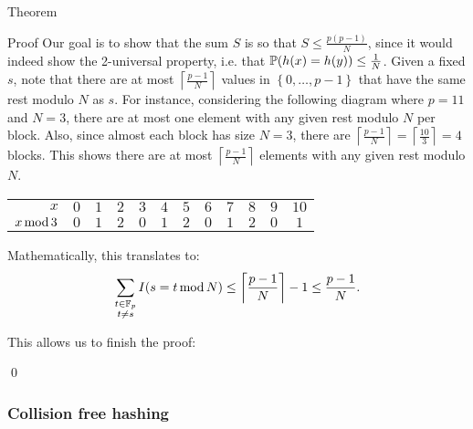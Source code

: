 \documentclass[a4paper]{article}
\begin{document}
\begin{parag}{Theorem}
\begin{subparag}{Proof}
            Our goal is to show that the sum $S$ is so that $S \leq \frac{p\left(p-1\right)}{N}$, since it would indeed show the 2-universal property, i.e. that $\prob\left(h\left(x\right) = h\left(y\right)\right) \leq \frac{1}{N}$. Given a fixed $s$, note that there are at most $\left\lceil \frac{p-1}{N} \right\rceil $ values in $\left\{0, \ldots, p-1\right\}$ that have the same rest modulo $N$ as $s$. For instance, considering the following diagram where $p = 11$ and $N = 3$, there are at most one element with any given rest modulo $N$ per block. Also, since almost each block has size $N = 3$, there are $\left\lceil \frac{p-1}{N} \right\rceil = \left\lceil \frac{10}{3} \right\rceil = 4$ blocks. This shows there are at most $\left\lceil \frac{p-1}{N} \right\rceil $ elements with any given rest modulo $N$.
            \begin{center}
            \renewcommand{\arraystretch}{1.75}
            \begin{tabular}{r|ccc|ccc|ccc|cc|}
                \cline{2-12}
                $x$ & $0$ & $1$ & $2$ & $3$ & $4$ & $5$ & $6$ & $7$ & $8$ & $9$ & $10$ \\
                $x \operatorname{mod} 3$ & $0$ & $1$ & $2$ & $0$ & $1$ & $2$ & $0$ & $1$ & $2$ & $0$ & $1$ \\
                \cline{2-12}
            \end{tabular}
            \renewcommand{\arraystretch}{1}
            \end{center}
            

            Mathematically, this translates to:
            \[\sum_{\substack{t \in \mathbb{F}_p \\ t \neq s}} I\left(s = t \Mod N\right) \leq \left\lceil \frac{p-1}{N} \right\rceil - 1 \leq \frac{p-1}{N}.\]

            This allows us to finish the proof: 

            \qed
    \end{subparag}
\end{parag}

\subsubsection{Collision free hashing}
\end{document}

